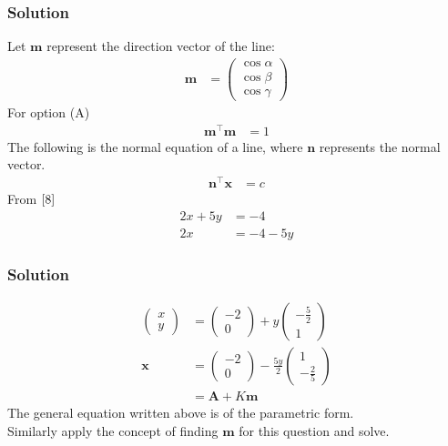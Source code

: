 \documentclass{beamer}
\begin{document}
\begin{frame}
\frametitle{Solution}
Let $\textbf{m}$ represent the direction vector of the line:
\begin{align}
    \textbf{m} &= \begin{pmatrix}
        \cos{\alpha} \\
        \cos{\beta}\\
        \cos{\gamma}
    \end{pmatrix}
\end{align}
For option (A)
\begin{align}
\textbf{m}^{\top}\textbf{m} &= 1
\end{align}
The following is the normal equation of a line, where $\textbf{n}$ represents the normal vector.
\begin{align}
    \textbf{n}^{\top}\textbf{x} &= c
\end{align}
From $\eqref{8}$
\begin{align}
    2x + 5y &= -4\\
    2x &= -4 -5y
    \end{align}
\end{frame}









\begin{frame}
\frametitle{Solution}
\begin{align}
    \begin{pmatrix}
        x\\
        y
    \end{pmatrix} &= \begin{pmatrix}
        -2\\
        0
    \end{pmatrix} + y\begin{pmatrix}
        -\frac{5}{2}\\
        1
    \end{pmatrix}\\
    \textbf{x} &= \begin{pmatrix}
        -2\\
        0
    \end{pmatrix} -\frac{5y}{2}\begin{pmatrix}
        1\\
        -\frac{2}{5}
    \end{pmatrix}\\
    &= \textbf{A} + K\textbf{m} \label{11}
\end{align}
The general equation written above is of the parametric form.\\
Similarly apply the concept of finding $\textbf{m}$ for this question and solve.    
\end{frame}
\end{document}
